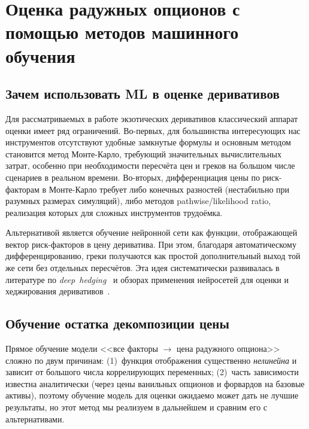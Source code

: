 \chapter{Оценка радужных опционов с помощью методов
         машинного обучения}
\label{ch:ml}

\section{Зачем использовать ML в оценке деривативов}
\label{sec:ml-why}

Для рассматриваемых в работе экзотических деривативов классический
аппарат оценки имеет ряд ограничений. Во-первых, для большинства
интересующих нас инструментов отсутствуют удобные замкнутые формулы и
основным методом становится метод Монте-Карло, требующий значительных
вычислительных затрат, особенно при необходимости пересчёта цен и
греков на большом числе сценариев в реальном времени. Во-вторых,
дифференциация цены по риск-факторам в Монте-Карло требует либо
конечных разностей (нестабильно при разумных размерах симуляций), либо
методов pathwise/likelihood ratio, реализация которых для сложных
инструментов трудоёмка.

Альтернативой является обучение нейронной сети как функции, отображающей
вектор риск-факторов в цену дериватива. При этом, благодаря
автоматическому дифференцированию, греки получаются как простой
дополнительный выход той же сети без отдельных пересчётов. Эта идея
систематически развивалась в литературе по
\emph{deep~hedging}~\cite{buhler2019deephedging} и обзорах применения
нейросетей для оценки и хеджирования
деривативов~\cite{horvath2021deepvol, joas2024}.

\section{Обучение остатка декомпозиции цены}
\label{sec:ml-residual}

Прямое обучение модели <<все факторы $\to$ цена радужного опциона>> сложно
по двум причинам:
(1)~функция отображения существенно \emph{нелинейна} и зависит от большого
числа коррелирующих переменных;
(2)~часть зависимости известна аналитически (через цены ванильных
опционов и форвардов на базовые активы), поэтому обучение модель для оценки ожидаемо 
может дать не лучшие результаты, но этот метод мы реализуем в дальнейшем и сравним его 
с альтернативами. 

